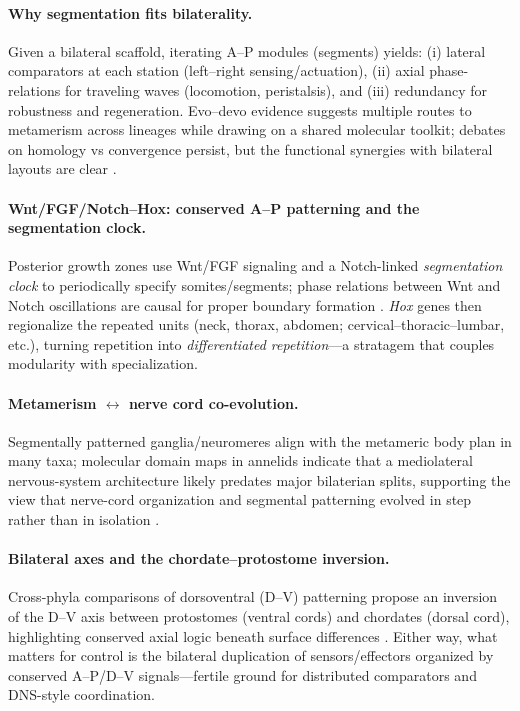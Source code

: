 \paragraph{Why segmentation fits bilaterality.}
Given a bilateral scaffold, iterating A–P modules (segments) yields: (i) lateral comparators at each station (left–right sensing/actuation), (ii) axial phase-relations for traveling waves (locomotion, peristalsis), and (iii) redundancy for robustness and regeneration. 
Evo–devo evidence suggests multiple routes to metamerism across lineages while drawing on a shared molecular toolkit; debates on homology vs convergence persist, but the functional synergies with bilateral layouts are clear \citep{HannibalPatel2013WhatIsASegment,ChipmanArias2019ArthropodSegmentation}.

\paragraph{Wnt/FGF/Notch–Hox: conserved A–P patterning and the segmentation clock.}
Posterior growth zones use Wnt/FGF signaling and a Notch-linked \emph{segmentation clock} to periodically specify somites/segments; phase relations between Wnt and Notch oscillations are causal for proper boundary formation \citep{AulehlaPourquie2010SignalingGradients,WahlEtAl2007FGFUpstream,SonnenEtAl2018PhaseShift}. 
\emph{Hox} genes then regionalize the repeated units (neck, thorax, abdomen; cervical–thoracic–lumbar, etc.), turning repetition into \emph{differentiated repetition}—a stratagem that couples modularity with specialization.

\paragraph{Metamerism $\leftrightarrow$ nerve cord co-evolution.}
Segmentally patterned ganglia/neuromeres align with the metameric body plan in many taxa; molecular domain maps in annelids indicate that a mediolateral nervous-system architecture likely predates major bilaterian splits, supporting the view that nerve-cord organization and segmental patterning evolved in step rather than in isolation \citep{DenesEtAl2007CellAnnelidCord}.

\paragraph{Bilateral axes and the chordate–protostome inversion.}
Cross-phyla comparisons of dorsoventral (D–V) patterning propose an inversion of the D–V axis between protostomes (ventral cords) and chordates (dorsal cord), highlighting conserved axial logic beneath surface differences \citep{ArendtNueblerJung1994NatureInversion,Gerhart2000PNASInversion}. 
Either way, what matters for control is the bilateral duplication of sensors/effectors organized by conserved A–P/D–V signals—fertile ground for distributed comparators and DNS-style coordination.

